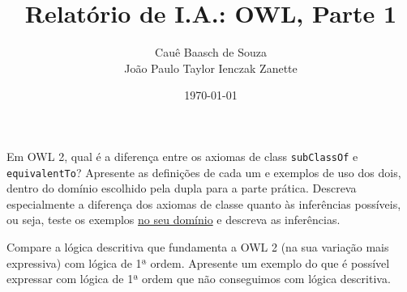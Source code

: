 \documentclass[answers]{exam}
\title{Relatório de I.A.: OWL, Parte 1}
\author{Cauê Baasch de Souza \\
        João Paulo Taylor Ienczak Zanette}
\date{\today}
\begin{document}
    \maketitle{}

    \begin{center}
    \end{center}


    \begin{questions}
        \question{}
        Em OWL 2, qual é a diferença entre os axiomas de class
        \texttt{subClassOf} e \texttt{equivalentTo}? Apresente as definições de
        cada um e exemplos de uso dos dois, dentro do domínio escolhido pela
        dupla para a parte prática. Descreva especialmente a diferença dos
        axiomas de classe quanto às inferências possíveis, ou seja, teste os
        exemplos \underline{no seu domínio} e descreva as inferências.

        \begin{solution}
        \end{solution}

        \question{}
        Compare a lógica descritiva que fundamenta a OWL 2 (na sua variação
        mais expressiva) com lógica de 1ª ordem. Apresente um exemplo do que é
        possível expressar com lógica de 1ª ordem que não conseguimos com
        lógica descritiva.

        \begin{solution}
        \end{solution}
    \end{questions}
\end{document}
